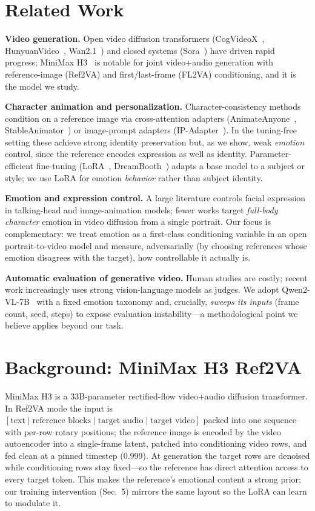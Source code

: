 \documentclass[conference]{IEEEtran}
\begin{document}
\section{Related Work}
\textbf{Video generation.} Open video diffusion transformers (CogVideoX~\cite{cogvideox2024},
HunyuanVideo~\cite{hunyuan2024}, Wan2.1~\cite{wan2025}) and closed systems
(Sora~\cite{sora2024}) have driven rapid progress; MiniMax H3~\cite{minimax2025} is notable for
joint video+audio generation with reference-image (Ref2VA) and first/last-frame (FL2VA)
conditioning, and it is the model we study.

\textbf{Character animation and personalization.} Character-consistency methods condition on a
reference image via cross-attention adapters (AnimateAnyone~\cite{animateanyone2023},
StableAnimator~\cite{stableanimator2024}) or image-prompt adapters
(IP-Adapter~\cite{ipadapter2023}). In the tuning-free setting these achieve strong identity
preservation but, as we show, weak \emph{emotion} control, since the reference encodes expression
as well as identity. Parameter-efficient fine-tuning (LoRA~\cite{lora2021},
DreamBooth~\cite{dreambooth2022}) adapts a base model to a subject or style; we use LoRA for
emotion \emph{behavior} rather than subject identity.

\textbf{Emotion and expression control.} A large literature controls facial expression in
talking-head and image-animation models; fewer works target \emph{full-body character} emotion in
video diffusion from a single portrait. Our focus is complementary: we treat emotion as a
first-class conditioning variable in an open portrait-to-video model and measure, adversarially
(by choosing references whose emotion disagrees with the target), how controllable it actually is.

\textbf{Automatic evaluation of generative video.} Human studies are costly; recent work
increasingly uses strong vision-language models as judges. We adopt
Qwen2-VL-7B~\cite{qwen2vl2024} with a fixed emotion taxonomy and, crucially, \emph{sweeps its
inputs} (frame count, seed, steps) to expose evaluation instability---a methodological point we
believe applies beyond our task.

\section{Background: MiniMax H3 Ref2VA}
MiniMax H3 is a 33B-parameter rectified-flow video+audio diffusion transformer. In Ref2VA mode the
input is $[\text{text} \mid \text{reference blocks} \mid \text{target audio} \mid
\text{target video}]$ packed into one sequence with per-row rotary positions; the reference image
is encoded by the video autoencoder into a single-frame latent, patched into conditioning video
rows, and fed clean at a pinned timestep (0.999). At generation the target rows are denoised while
conditioning rows stay fixed---so the reference has direct attention access to every target token.
This makes the reference's emotional content a strong prior; our training intervention (Sec.~5)
mirrors the same layout so the LoRA can learn to modulate it.
\end{document}
